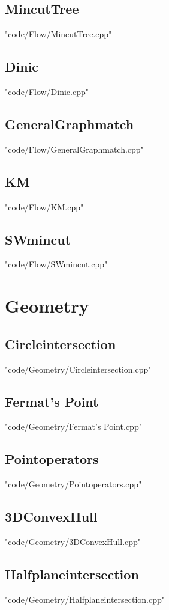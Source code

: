 \documentclass [8pt,a4paper,twocolumn]{article}
\begin{document}
\subsection{MincutTree}
 {"code/Flow/MincutTree.cpp"}
\subsection{Dinic}
 {"code/Flow/Dinic.cpp"}
\subsection{GeneralGraphmatch}
 {"code/Flow/GeneralGraphmatch.cpp"}
\subsection{KM}
 {"code/Flow/KM.cpp"}
\subsection{SWmincut}
 {"code/Flow/SWmincut.cpp"}
\section{Geometry}
\subsection{Circleintersection}
 {"code/Geometry/Circleintersection.cpp"}
\subsection{Fermat's Point}
 {"code/Geometry/Fermat's Point.cpp"}
\subsection{Pointoperators}
 {"code/Geometry/Pointoperators.cpp"}
\subsection{3DConvexHull}
 {"code/Geometry/3DConvexHull.cpp"}
\subsection{Halfplaneintersection}
 {"code/Geometry/Halfplaneintersection.cpp"}
\end{document}
